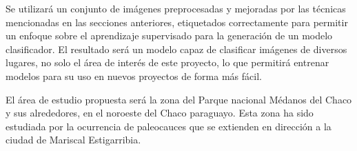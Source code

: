 Se utilizará un conjunto de imágenes preprocesadas y mejoradas por las técnicas mencionadas en las secciones
anteriores, etiquetados correctamente para permitir un enfoque sobre el aprendizaje supervisado para la generación de
un modelo clasificador. El resultado será un modelo capaz de clasificar imágenes de diversos lugares, no solo el área
de interés de este proyecto, lo que permitirá entrenar modelos para su uso en nuevos proyectos de forma más fácil.

El área de estudio propuesta será la zona del Parque nacional Médanos del Chaco y sus alrededores, en el noroeste del
Chaco paraguayo. Esta zona ha sido estudiada por la ocurrencia de paleocauces que se extienden en dirección a la ciudad
de Mariscal Estigarribia.
